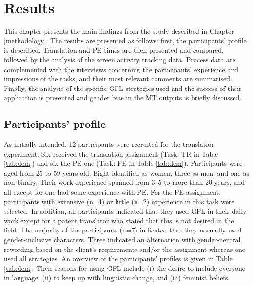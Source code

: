 \chapter{Results} \label{results}

This chapter presents the main findings from the study described in Chapter \ref{methodology}. The results are presented as follows: first, the participants' profile is described. Translation and PE times are then presented and compared, followed by the analysis of the screen activity tracking data. Process data are complemented with the interviews concerning the participants' experience and impressions of the tasks, and their most relevant comments are summarised. Finally, the analysis of the specific GFL strategies used and the success of their application is presented and gender bias in the MT outputs is briefly discussed.


\section{Participants' profile}
As initially intended, 12 participants were recruited for the translation experiment. Six received the translation assignment (Task: TR in Table \ref{tab:dem}) and six the PE one (Task: PE in Table \ref{tab:dem}). Participants were aged from 25 to 59 years old. Eight identified as women, three as men, and one as non-binary. Their work experience spanned from 3--5 to more than 20 years, and all except for one had some experience with PE. For the PE assignment, participants with extensive (n=4) or little (n=2) experience in this task were selected. In addition, all participants indicated that they used GFL in their daily work except for a patent translator who stated that this is not desired in the field. The majority of the participants (n=7) indicated that they normally used gender-inclusive characters. Three indicated an alternation with gender-neutral rewording based on the client's requirements and/or the assignment whereas one used all strategies. An overview of the participants' profiles is given in Table \ref{tab:dem}. Their reasons for using GFL include (i) the desire to include everyone in language, (ii) to keep up with linguistic change, and (iii) feminist beliefs. 


